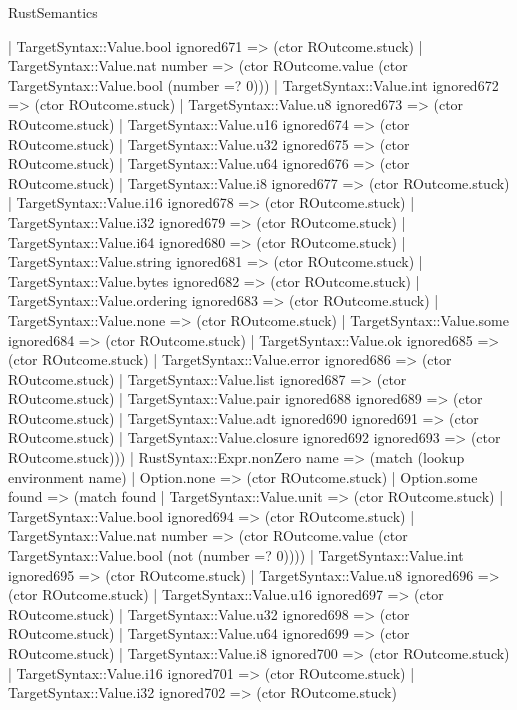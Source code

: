 \begin{lexlean}{RustSemantics}
\begin{semanticmodule}
{          | TargetSyntax::Value.bool ignored671 => (ctor ROutcome.stuck)
          | TargetSyntax::Value.nat number => (ctor ROutcome.value (ctor TargetSyntax::Value.bool (number =? 0)))
          | TargetSyntax::Value.int ignored672 => (ctor ROutcome.stuck)
          | TargetSyntax::Value.u8 ignored673 => (ctor ROutcome.stuck)
          | TargetSyntax::Value.u16 ignored674 => (ctor ROutcome.stuck)
          | TargetSyntax::Value.u32 ignored675 => (ctor ROutcome.stuck)
          | TargetSyntax::Value.u64 ignored676 => (ctor ROutcome.stuck)
          | TargetSyntax::Value.i8 ignored677 => (ctor ROutcome.stuck)
          | TargetSyntax::Value.i16 ignored678 => (ctor ROutcome.stuck)
          | TargetSyntax::Value.i32 ignored679 => (ctor ROutcome.stuck)
          | TargetSyntax::Value.i64 ignored680 => (ctor ROutcome.stuck)
          | TargetSyntax::Value.string ignored681 => (ctor ROutcome.stuck)
          | TargetSyntax::Value.bytes ignored682 => (ctor ROutcome.stuck)
          | TargetSyntax::Value.ordering ignored683 => (ctor ROutcome.stuck)
          | TargetSyntax::Value.none => (ctor ROutcome.stuck)
          | TargetSyntax::Value.some ignored684 => (ctor ROutcome.stuck)
          | TargetSyntax::Value.ok ignored685 => (ctor ROutcome.stuck)
          | TargetSyntax::Value.error ignored686 => (ctor ROutcome.stuck)
          | TargetSyntax::Value.list ignored687 => (ctor ROutcome.stuck)
          | TargetSyntax::Value.pair ignored688 ignored689 => (ctor ROutcome.stuck)
          | TargetSyntax::Value.adt ignored690 ignored691 => (ctor ROutcome.stuck)
          | TargetSyntax::Value.closure ignored692 ignored693 => (ctor ROutcome.stuck)))
      | RustSyntax::Expr.nonZero name => (match (lookup environment name)
        | Option.none => (ctor ROutcome.stuck)
        | Option.some found => (match found
          | TargetSyntax::Value.unit => (ctor ROutcome.stuck)
          | TargetSyntax::Value.bool ignored694 => (ctor ROutcome.stuck)
          | TargetSyntax::Value.nat number => (ctor ROutcome.value (ctor TargetSyntax::Value.bool (not (number =? 0))))
          | TargetSyntax::Value.int ignored695 => (ctor ROutcome.stuck)
          | TargetSyntax::Value.u8 ignored696 => (ctor ROutcome.stuck)
          | TargetSyntax::Value.u16 ignored697 => (ctor ROutcome.stuck)
          | TargetSyntax::Value.u32 ignored698 => (ctor ROutcome.stuck)
          | TargetSyntax::Value.u64 ignored699 => (ctor ROutcome.stuck)
          | TargetSyntax::Value.i8 ignored700 => (ctor ROutcome.stuck)
          | TargetSyntax::Value.i16 ignored701 => (ctor ROutcome.stuck)
          | TargetSyntax::Value.i32 ignored702 => (ctor ROutcome.stuck)
}
\end{semanticmodule}
\end{lexlean}
